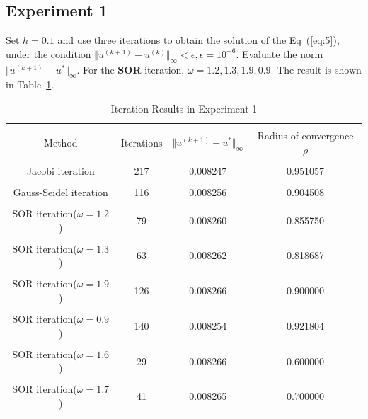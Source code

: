 \documentclass[a4paper,11pt]{article}
\begin{document}
\subsection{Experiment 1}
Set $h=0.1$ and use three iterations to obtain the solution of the Eq~(\ref{eq:5}), under the condition $\Vert u^{(k+1)}-u^{(k)}\Vert_\infty < \epsilon, \epsilon=10^{-6}$. Evaluate the norm $\Vert u^{(k+1)}-u^{*}\Vert_\infty$. For the \textbf{SOR} iteration, $\omega=1.2,1.3,1.9,0.9$. The result is shown in Table~\ref{table1}.
\begin{table}[h]
    \centering
    \caption{Iteration Results in Experiment 1}
    \label{table1}
    \begin{tabular}{|c|c|c|c|}
        \hline
        & & & \\[-6pt]
        Method&Iterations&$\Vert u^{(k+1)}-u^{*}\Vert_\infty$&Radius of convergence $\rho$ \\
        \hline
        & & & \\[-6pt]
        Jacobi iteration&217&0.008247&0.951057\\
        \hline
        & & & \\[-6pt]
        Gauss-Seidel iteration&116&0.008256&0.904508\\
        \hline
        & & & \\[-6pt]
        SOR iteration($\omega=1.2$)&79&0.008260&0.855750\\
        \hline
        & & & \\[-6pt]
        SOR iteration($\omega=1.3$)&63&0.008262&0.818687\\
        \hline
        & & & \\[-6pt]
        SOR iteration($\omega=1.9$)&126&0.008266&0.900000\\
        \hline
        & & & \\[-6pt]
        SOR iteration($\omega=0.9$)&140&0.008254&0.921804\\
        \hline
        & & & \\[-6pt]
        SOR iteration($\omega=1.6$)&29&0.008266&0.600000\\
        \hline
        & & & \\[-6pt]
        SOR iteration($\omega=1.7$)&41&0.008265&0.700000\\
        \hline
    \end{tabular}
\end{table}
\end{document}
